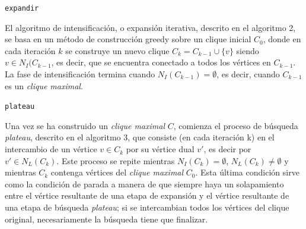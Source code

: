 \documentclass[conference]{IEEEtran}
\begin{document}
\begin{scriptsize}
\LinesNumbered
\begin{algoritmo}[htp]
\label{dls:algo}

 \caption{\texttt{expandir}}
  \DontPrintSemicolon
\end{algoritmo}
\end{scriptsize}

El algoritmo de intensificación, o expansión iterativa, descrito en el
algoritmo 2, se basa en un método de construcción greedy sobre un
clique inicial $C_0$, donde en cada iteración $k$ se construye un
nuevo clique $C_k = C_{k-1} \cup \lbrace v \rbrace$ siendo $v \in
N_I(C_{k-1}$, es decir, que se encuentra conectado a todos los
vértices en $C_{k-1}$.  La fase de intensificación termina cuando
$N_I(C_{k-1}) = \emptyset$, es decir, cuando $C_{k-1}$ es un
\emph{clique maximal}.


\begin{scriptsize}
\LinesNumbered
\begin{algoritmo}[htp]
\label{dls:algo}
 \caption{\texttt{plateau}}
  \DontPrintSemicolon
\end{algoritmo}
\end{scriptsize}

Una vez se ha construido un \emph{clique maximal} $C$, comienza el
proceso de búsqueda \emph{plateau}, descrito en el algoritmo 3, que
consiste (en cada iteración k) en el intercambio de un vértice $v \in
C_k$ por su vértice dual $v'$, es decir por $v' \in N_L(C_k)$. Este
proceso se repite mientras $N_I(C_k) = \emptyset$, $N_L(C_k) \neq
\emptyset$ y mientras $C_k$ contenga vértices del \emph{clique
  maximal} $C_0$. Esta última condición sirve como la condición de
parada a manera de que siempre haya un solapamiento entre el vértice
resultante de una etapa de expansión y el vértice resultante de una
etapa de búsqueda \emph{plateau}; si se intercambian todos los
vértices del clique original, necesariamente la búsqueda tiene que
finalizar.
\end{document}
